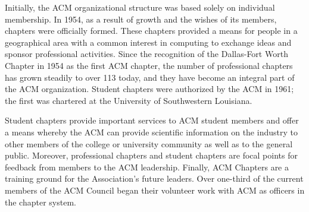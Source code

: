 Initially, the ACM organizational structure was based solely on individual
membership. In 1954, as a result of growth and the wishes of its members,
chapters were officially formed. These chapters provided a means for people
in a geographical area with a common interest in computing to exchange ideas and
sponsor professional activities. Since the recognition of the Dallas-Fort Worth
Chapter in 1954 as the first ACM chapter, the number of professional chapters
has grown steadily to over 113 today, and they have become an integral part of
the ACM organization. Student chapters were authorized by the ACM in 1961; the
first was chartered at the University of Southwestern Louisiana.

Student chapters provide important services to ACM student members and offer a
means whereby the ACM can provide scientific information on the industry to
other members of the college or university community as well as to the general
public. Moreover, professional chapters and student chapters are focal points
for feedback from members to the ACM leadership. Finally, ACM Chapters are a
training ground for the Association's future leaders. Over one-third of the
current members of the ACM Council began their volunteer work with ACM as
officers in the chapter system.

